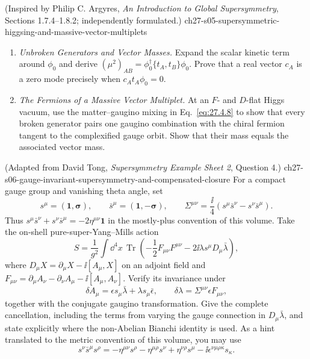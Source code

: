 \begin{enumerate}
    {(Inspired by Philip C. Argyres, \emph{An Introduction to Global Supersymmetry}, Sections 1.7.4--1.8.2; independently formulated.)}
    {ch27-s05-supersymmetric-higgsing-and-massive-vector-multiplets}
  \begin{enumerate}
    \item \emph{Unbroken Generators and Vector Masses.}
    Expand the scalar kinetic term around \(\phi_0\) and derive
      \((\mu^2)_{AB}=\phi_0^\dagger\{t_A,t_B\}\phi_0\).
      Prove that a real vector \(c_A\) is a zero mode precisely when
      \(c_At_A\phi_0=0\).
    \item \emph{The Fermions of a Massive Vector Multiplet.}
    At an \(F\)- and \(D\)-flat Higgs vacuum, use the matter--gaugino mixing
      in Eq.~\eqref{eq:27.4.8} to show that every broken generator pairs one
      gaugino combination with the chiral fermion tangent to the complexified
      gauge orbit.  Show that their mass equals the associated vector mass.
  \end{enumerate}

    {(Adapted from David Tong, \emph{Supersymmetry Example Sheet 2}, Question 4.)}
    {ch27-s06-gauge-invariant-supersymmetry-and-compensated-closure}
For a compact gauge group and vanishing theta angle, set
  \[
    s^\mu=(\mathbf{1},\boldsymbol{\sigma}),\qquad
    \bar s^\mu=(\mathbf{1},-\boldsymbol{\sigma}),\qquad
    \Sigma^{\mu\nu}
      =\frac{\ii}{4}(s^\mu\bar s^\nu-s^\nu\bar s^\mu).
  \]
  Thus
  \(s^\mu\bar s^\nu+s^\nu\bar s^\mu
    =-2\eta^{\mu\nu}\mathbf{1}\) in the mostly-plus convention of this
  volume.  Take the on-shell pure-super-Yang--Mills action
  \[
    S=\frac1{g^2}\int \dd^4x\,\operatorname{Tr}
      \left(-\frac12F_{\mu\nu}F^{\mu\nu}
            -2\ii\lambda s^\mu D_\mu\bar\lambda\right),
  \]
  where \(D_\mu X=\partial_\mu X-\ii[A_\mu,X]\) on an adjoint field and
  \(F_{\mu\nu}=\partial_\mu A_\nu-\partial_\nu A_\mu-\ii[A_\mu,A_\nu]\).
  Verify its invariance under
  \[
    \delta A_\mu=\epsilon s_\mu\bar\lambda
                   +\lambda s_\mu\bar\epsilon,\qquad
    \delta\lambda=\Sigma^{\mu\nu}\epsilon F_{\mu\nu},
  \]
  together with the conjugate gaugino transformation.  Give the complete
  cancellation, including the terms from varying the gauge connection in
  \(D_\mu\bar\lambda\), and state explicitly where the non-Abelian Bianchi
  identity is used.  As a hint translated to the metric convention of this
  volume, you may use
  \[
    s^\nu\bar s^\mu s^\rho
      =-\eta^{\mu\nu}s^\rho-\eta^{\mu\rho}s^\nu
       +\eta^{\nu\rho}s^\mu
       -\ii\epsilon^{\nu\mu\rho\kappa}s_\kappa .
  \]


\end{enumerate}
